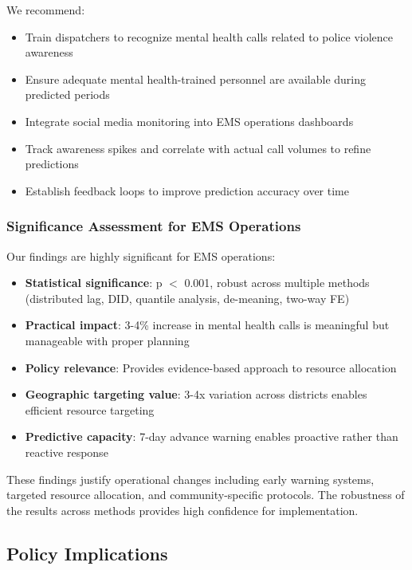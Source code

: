 \documentclass[11pt,a4paper]{article}
\begin{document}
We recommend:

\begin{itemize}
    \item Train dispatchers to recognize mental health calls related to police violence awareness
    \item Ensure adequate mental health-trained personnel are available during predicted periods
    \item Integrate social media monitoring into EMS operations dashboards
    \item Track awareness spikes and correlate with actual call volumes to refine predictions
    \item Establish feedback loops to improve prediction accuracy over time
\end{itemize}

\subsubsection{Significance Assessment for EMS Operations}

Our findings are highly significant for EMS operations:

\begin{itemize}
    \item \textbf{Statistical significance}: p $<$ 0.001, robust across multiple methods (distributed lag, DID, quantile analysis, de-meaning, two-way FE)
    \item \textbf{Practical impact}: 3-4\% increase in mental health calls is meaningful but manageable with proper planning
    \item \textbf{Policy relevance}: Provides evidence-based approach to resource allocation
    \item \textbf{Geographic targeting value}: 3-4x variation across districts enables efficient resource targeting
    \item \textbf{Predictive capacity}: 7-day advance warning enables proactive rather than reactive response
\end{itemize}

These findings justify operational changes including early warning systems, targeted resource allocation, and community-specific protocols. The robustness of the results across methods provides high confidence for implementation.

\subsection{Policy Implications}
\end{document}
